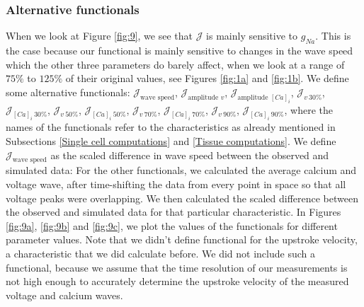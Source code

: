 \documentclass{article}
\begin{document}
\subsubsection{Alternative functionals} \label{Alternative functionals}
When we look at Figure \ref{fig:9}, we see that $\mathcal{J}$ is mainly sensitive to $g_{Na}$. This is the case because our functional is mainly sensitive to changes in the wave speed which the other three parameters do barely affect, when we look at a range of $75\%$ to $125 \%$ of their original values, see Figures \ref{fig:1a} and \ref{fig:1b}. We define some alternative functionals: $\mathcal{J}_{\mbox{wave speed}}$, $\mathcal{J}_{\mbox{amplitude $v$}}$, $\mathcal{J}_{\mbox{amplitude $[Ca]_i$}}$, $\mathcal{J}_{v \:30 \%}$,
$\mathcal{J}_{[Ca]_i \:30 \%}$, $\mathcal{J}_{v \:50 \%}$,
$\mathcal{J}_{[Ca]_i \:50 \%}$,  $\mathcal{J}_{v \:70 \%}$,
$\mathcal{J}_{[Ca]_i \:70 \%}$,  $\mathcal{J}_{v \:90 \%}$,
$\mathcal{J}_{[Ca]_i \:90 \%}$, where the names of the functionals refer to the characteristics as already mentioned in Subsections \ref{Single cell computations} and \ref{Tissue computations}. We define $\mathcal{J}_{\mbox{wave speed}}$ as the scaled difference in wave speed between the observed and simulated data:
%
For the other functionals, we calculated the average calcium and voltage wave, after time-shifting the data from every point in space so that all voltage peaks were overlapping. We then calculated the scaled difference between the observed and simulated data for that particular characteristic. In Figures \ref{fig:9a}, \ref{fig:9b} and \ref{fig:9c}, we plot the values of the functionals for different parameter values. Note that we didn't define functional for the upstroke velocity, a characteristic that we did calculate before. We did not include such a functional, because we assume that the time resolution of our measurements is not high enough to accurately determine the upstroke velocity of the measured voltage and calcium waves.
\end{document}
